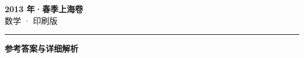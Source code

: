 \documentclass[zihao=5, a4paper]{ctexart}
\begin{document}
\begin{center}
  {\Large\bfseries 2013 年·春季上海卷}\\[4pt]
  {\large 数学 · 印刷版}
\end{center}
\medskip
{}

\par\bigskip\hrule\bigskip
{}
\Needspace{0.55\textheight}
\begin{center}{\large\bfseries 参考答案与详细解析}\end{center}
\smallskip

\end{document}
